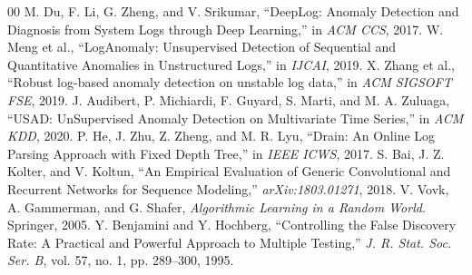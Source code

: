 \documentclass[conference]{IEEEtran}
\begin{document}
\begin{thebibliography}{00}
 M. Du, F. Li, G. Zheng, and V. Srikumar, ``DeepLog: Anomaly Detection and Diagnosis from System Logs through Deep Learning,'' in \textit{ACM CCS}, 2017.
 W. Meng et al., ``LogAnomaly: Unsupervised Detection of Sequential and Quantitative Anomalies in Unstructured Logs,'' in \textit{IJCAI}, 2019.
 X. Zhang et al., ``Robust log-based anomaly detection on unstable log data,'' in \textit{ACM SIGSOFT FSE}, 2019.
 J. Audibert, P. Michiardi, F. Guyard, S. Marti, and M. A. Zuluaga, ``USAD: UnSupervised Anomaly Detection on Multivariate Time Series,'' in \textit{ACM KDD}, 2020.
 P. He, J. Zhu, Z. Zheng, and M. R. Lyu, ``Drain: An Online Log Parsing Approach with Fixed Depth Tree,'' in \textit{IEEE ICWS}, 2017.
 S. Bai, J. Z. Kolter, and V. Koltun, ``An Empirical Evaluation of Generic Convolutional and Recurrent Networks for Sequence Modeling,'' \textit{arXiv:1803.01271}, 2018.
 V. Vovk, A. Gammerman, and G. Shafer, \textit{Algorithmic Learning in a Random World}. Springer, 2005.
 Y. Benjamini and Y. Hochberg, ``Controlling the False Discovery Rate: A Practical and Powerful Approach to Multiple Testing,'' \textit{J. R. Stat. Soc. Ser. B}, vol. 57, no. 1, pp. 289--300, 1995.
\end{thebibliography}
\end{document}

